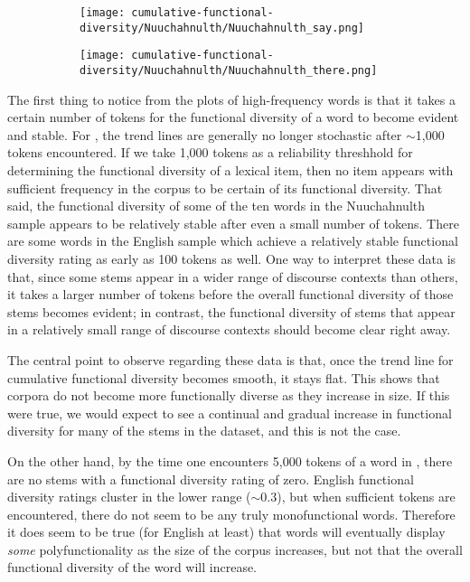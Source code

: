 \begin{figure}
  \begin{subfigure}{0.5\linewidth}
    \centering
    \caption{ }
    \texttt{[image: cumulative-functional-diversity/Nuuchahnulth/Nuuchahnulth\_say.png]}
  \end{subfigure}%
  \begin{subfigure}{0.5\linewidth}
    \centering
    \caption{ }
    \texttt{[image: cumulative-functional-diversity/Nuuchahnulth/Nuuchahnulth\_there.png]}
  \end{subfigure}

\end{figure}

The first thing to notice from the plots of high-frequency words is that it takes a certain number of tokens for the functional diversity of a word to become evident and stable. For , the trend lines are generally no longer stochastic after $\sim$1,000 tokens encountered. If we take 1,000 tokens as a reliability threshhold for determining the functional diversity of a lexical item, then no  item appears with sufficient frequency in the corpus to be certain of its functional diversity. That said, the functional diversity of some of the ten words in the Nuuchahnulth sample appears to be relatively stable after even a small number of tokens. There are some words in the English sample which achieve a relatively stable functional diversity rating as early as 100 tokens as well. One way to interpret these data is that, since some stems appear in a wider range of discourse contexts than others, it takes a larger number of tokens before the overall functional diversity of those stems becomes evident; in contrast, the functional diversity of stems that appear in a relatively small range of discourse contexts should become clear right away.

The central point to observe regarding these data is that, once the trend line for cumulative functional diversity becomes smooth, it stays flat. This shows that corpora do not become more functionally diverse as they increase in size. If this were true, we would expect to see a continual and gradual increase in functional diversity for many of the stems in the dataset, and this is not the case.

On the other hand, by the time one encounters 5,000 tokens of a word in , there are no stems with a functional diversity rating of zero. English functional diversity ratings cluster in the lower range ($\sim0.3$), but when sufficient tokens are encountered, there do not seem to be any truly monofunctional words. Therefore it does seem to be true (for English at least) that words will eventually display \emph{some} polyfunctionality as the size of the corpus increases, but not that the overall functional diversity of the word will increase.

